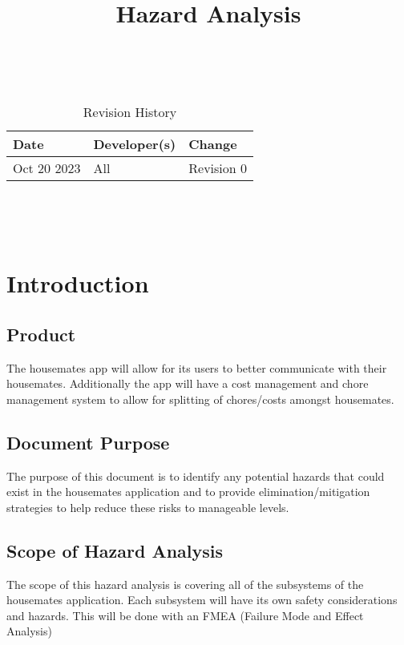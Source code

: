 \documentclass{article}
\title{Hazard Analysis\\\progname}
\author{\authname}
\date{}
\begin{document}
\maketitle
\thispagestyle{empty}

~\newpage


\begin{table}[hp]
\caption{Revision History} \label{TblRevisionHistory}
\begin{tabularx}{\textwidth}{llX}
\toprule
\textbf{Date} & \textbf{Developer(s)} & \textbf{Change}\\
\midrule
Oct 20 2023 & All & Revision 0\\
\bottomrule
\end{tabularx}
\end{table}

~\newpage

\tableofcontents

~\newpage



\section{Introduction}

\subsection{Product}
The housemates app will allow for its users to better communicate with their housemates.  Additionally the app will have a cost management and chore management system to allow for splitting of chores/costs amongst housemates.

\subsection{Document Purpose}
The purpose of this document is to identify any potential hazards that could exist in the housemates application and to provide elimination/mitigation strategies to help reduce these risks to manageable levels.

\subsection{Scope of Hazard Analysis}
The scope of this hazard analysis is covering all of the subsystems of the housemates application. Each subsystem will have its own safety considerations and hazards. This will be done with an FMEA (Failure Mode and Effect Analysis)
\end{document}
